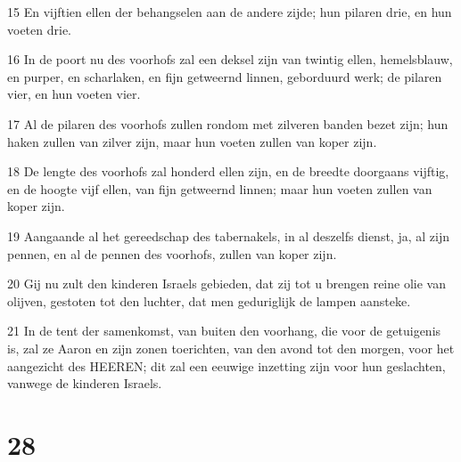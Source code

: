 \par 15 En vijftien ellen der behangselen aan de andere zijde; hun pilaren drie, en hun voeten drie.
\par 16 In de poort nu des voorhofs zal een deksel zijn van twintig ellen, hemelsblauw, en purper, en scharlaken, en fijn getweernd linnen, geborduurd werk; de pilaren vier, en hun voeten vier.
\par 17 Al de pilaren des voorhofs zullen rondom met zilveren banden bezet zijn; hun haken zullen van zilver zijn, maar hun voeten zullen van koper zijn.
\par 18 De lengte des voorhofs zal honderd ellen zijn, en de breedte doorgaans vijftig, en de hoogte vijf ellen, van fijn getweernd linnen; maar hun voeten zullen van koper zijn.
\par 19 Aangaande al het gereedschap des tabernakels, in al deszelfs dienst, ja, al zijn pennen, en al de pennen des voorhofs, zullen van koper zijn.
\par 20 Gij nu zult den kinderen Israels gebieden, dat zij tot u brengen reine olie van olijven, gestoten tot den luchter, dat men geduriglijk de lampen aansteke.
\par 21 In de tent der samenkomst, van buiten den voorhang, die voor de getuigenis is, zal ze Aaron en zijn zonen toerichten, van den avond tot den morgen, voor het aangezicht des HEEREN; dit zal een eeuwige inzetting zijn voor hun geslachten, vanwege de kinderen Israels.

\chapter{28}

